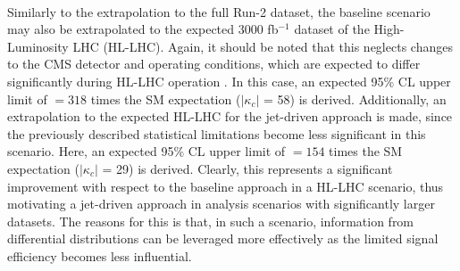 \\
Similarly to the extrapolation to the full Run-2 dataset, the baseline scenario may also be extrapolated to the expected 3000 fb$^{-1}$ dataset of the High-Luminosity LHC (HL-LHC). Again, it should be noted that this neglects changes to the CMS detector and operating conditions, which are expected to differ significantly during HL-LHC operation \cite{HLLHC-CMS}. In this case, an expected  95\% CL upper limit of \sBR$ = 318$ times the SM expectation ($\mid$$\kappa_c$$\mid$ = 58) is derived. Additionally, an extrapolation to the expected HL-LHC for the jet-driven approach is made, since the previously described statistical limitations become less significant in this scenario. Here, an expected 95\% CL upper limit of \sBR$ = 154$ times the SM expectation ($\mid$$\kappa_c$$\mid$ = 29) is derived. Clearly, this represents a significant improvement with respect to the baseline approach in a HL-LHC scenario, thus motivating a jet-driven approach in analysis scenarios with significantly larger datasets. The reasons for this is that, in such a scenario, information from differential distributions can be leveraged more effectively as the limited signal efficiency becomes less influential. 
